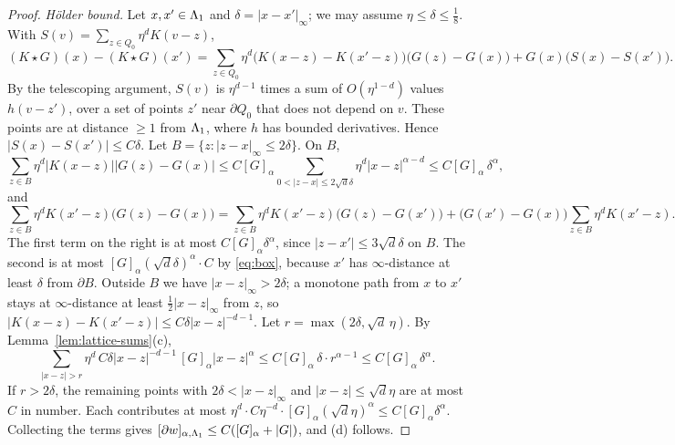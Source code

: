 \begin{proof}
\emph{H\"older bound.} Let $x,x'\in\Lambda_1$ and $\delta=|x-x'|_\infty$; we may assume $\eta\le\delta\le\frac18$. With $S(v)=\sum_{z\in Q_0}\eta^dK(v-z)$,
\[
(K\star G)(x)-(K\star G)(x')=\sum_{z\in Q_0}\eta^d\big(K(x-z)-K(x'-z)\big)\big(G(z)-G(x)\big)+G(x)\big(S(x)-S(x')\big).
\]
By the telescoping argument, $S(v)$ is $\eta^{d-1}$ times a sum of $O(\eta^{1-d})$ values $h(v-z')$, over a set of points $z'$ near $\partial Q_0$ that does not depend on $v$. These points are at distance $\ge1$ from $\Lambda_1$, where $h$ has bounded derivatives. Hence $|S(x)-S(x')|\le C\delta$. Let $B=\{z:|z-x|_\infty\le2\delta\}$. On $B$,
\[
\sum_{z\in B}\eta^d|K(x-z)||G(z)-G(x)|\le C[G]_\alpha\sum_{0<|z-x|\le2\sqrt d\delta}\eta^d|x-z|^{\alpha-d}\le C[G]_\alpha\,\delta^\alpha,
\]
and
\[
\sum_{z\in B}\eta^dK(x'-z)\big(G(z)-G(x)\big)=\sum_{z\in B}\eta^dK(x'-z)\big(G(z)-G(x')\big)+\big(G(x')-G(x)\big)\sum_{z\in B}\eta^dK(x'-z).
\]
The first term on the right is at most $C[G]_\alpha\delta^\alpha$, since $|z-x'|\le3\sqrt d\delta$ on $B$. The second is at most $[G]_\alpha(\sqrt d\delta)^\alpha\cdot C$ by \eqref{eq:box}, because $x'$ has $\infty$-distance at least $\delta$ from $\partial B$. Outside $B$ we have $|x-z|_\infty>2\delta$; a monotone path from $x$ to $x'$ stays at $\infty$-distance at least $\frac12|x-z|_\infty$ from $z$, so $|K(x-z)-K(x'-z)|\le C\delta|x-z|^{-d-1}$. Let $r=\max(2\delta,\sqrt d\,\eta)$. By Lemma~\ref{lem:lattice-sums}(c),
\[
\sum_{|x-z|>r}\eta^d\,C\delta|x-z|^{-d-1}\,[G]_\alpha|x-z|^\alpha\le C[G]_\alpha\,\delta\cdot r^{\alpha-1}\le C[G]_\alpha\,\delta^\alpha .
\]
If $r>2\delta$, the remaining points with $2\delta<|x-z|_\infty$ and $|x-z|\le\sqrt d\eta$ are at most $C$ in number. Each contributes at most $\eta^d\cdot C\eta^{-d}\cdot[G]_\alpha(\sqrt d\eta)^\alpha\le C[G]_\alpha\delta^\alpha$.
Collecting the terms gives $[\partial w]_{\alpha,\Lambda_1}\le C([G]_\alpha+|G|)$, and (d) follows.
\end{proof}

